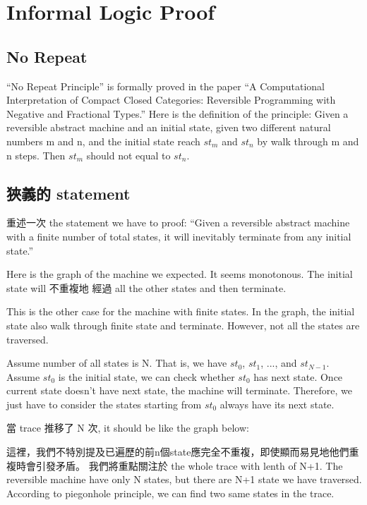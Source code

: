 \section{Informal Logic Proof}

\subsection{ No Repeat }
``No Repeat Principle'' is formally proved in the paper ``A Computational Interpretation of Compact Closed Categories: Reversible Programming with Negative and Fractional Types.''
Here is the definition of the principle:
Given a reversible abstract machine and an initial state, given two different natural numbers m and n, and the initial state reach $st_{m}$ and $st_{n}$ by walk through m and n steps.
Then $st_{m}$ should not equal to $st_{n}$.

\subsection{ 狹義的 statement }
重述一次 the statement we have to proof:
``Given a reversible abstract machine with a finite number of total states, it will inevitably terminate from any initial state.''

Here is the graph of the machine we expected.  It seems monotonous.  The initial state will 不重複地 經過 all the other states and then terminate.



This is the other case for the machine with finite states.  In the graph, the initial state also walk through finite state and terminate.  However, not all the states are traversed.




Assume number of all states is N.  That is, we have $st_{0}$, $st_{1}$, ..., and $st_{N-1}$.
Assume $st_{0}$ is the initial state, we can check whether $st_{0}$ has next state.
Once current state doesn't have next state, the machine will terminate.  
Therefore, we just have to consider the states starting from $st_{0}$ always have its next state.

當 trace 推移了 N 次, it should be like the graph below:



這裡，我們不特別提及已遍歷的前n個state應完全不重複，即使顯而易見地他們重複時會引發矛盾。
我們將重點關注於 the whole trace with lenth of N+1.
The reversible machine have only N states, but there are N+1 state we have traversed.
According to piegonhole principle, we can find two same states in the trace.

